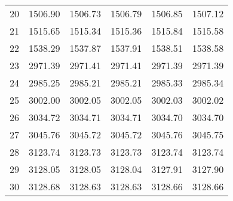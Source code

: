 \documentclass[10pt,oneside]{article}
\begin{document}
\begin{table}[h!]
\begin{tabular}{cccccc}
20 &   1506.90 & 1506.73 &    1506.79 & 1506.85 &   1507.12 \\
21 &   1515.65 & 1515.34 &    1515.36 & 1515.84 &   1515.58 \\
22 &   1538.29 & 1537.87 &    1537.91 & 1538.51 &   1538.58 \\
23 &   2971.39 & 2971.41 &    2971.41 & 2971.39 &   2971.39 \\
24 &   2985.25 & 2985.21 &    2985.21 & 2985.33 &   2985.34 \\
25 &   3002.00 & 3002.05 &    3002.05 & 3002.03 &   3002.02 \\
26 &   3034.72 & 3034.71 &    3034.71 & 3034.70 &   3034.70 \\
27 &   3045.76 & 3045.72 &    3045.72 & 3045.76 &   3045.75 \\
28 &   3123.74 & 3123.73 &    3123.73 & 3123.74 &   3123.74 \\
29 &   3128.05 & 3128.05 &    3128.04 & 3127.91 &   3127.90 \\
30 &   3128.68 & 3128.63 &    3128.63 & 3128.66 &   3128.66 \\
\bottomrule
\end{tabular}
\end{table}
\end{document}
